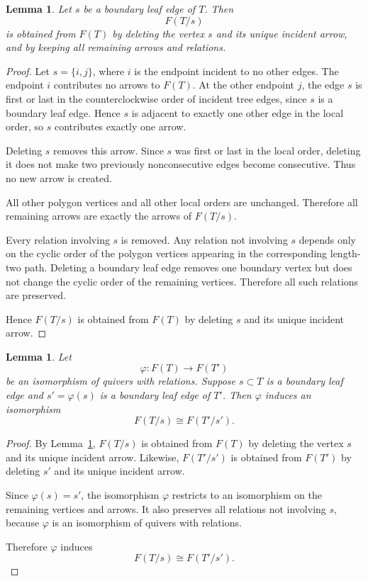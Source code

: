 \documentclass[12pt]{amsart}
\newtheorem{lem}[thm]{Lemma}
\theoremstyle{definition}
\theoremstyle{remark}
\numberwithin{equation}{section}
\begin{document}
\begin{lem}\label{lem:deletion-compatible}
Let \(s\) be a boundary leaf edge of \(T\). Then
\[
F(T/s)
\]
is obtained from \(F(T)\) by deleting the vertex \(s\) and its unique incident arrow, and by keeping all remaining arrows and relations.
\end{lem}

\begin{proof}
Let $s = \{i,j\}$, where $i$ is the endpoint incident to no other edges. The endpoint $i$ contributes no arrows to \(F(T)\). At the other endpoint $j$, the edge \(s\) is first or last in the counterclockwise order of incident tree edges, since \(s\) is a boundary leaf edge. Hence \(s\) is adjacent to exactly one other edge in the local order, so \(s\) contributes exactly one arrow.

Deleting \(s\) removes this arrow. Since \(s\) was first or last in the local order, deleting it does not make two previously nonconsecutive edges become consecutive. Thus no new arrow is created.

All other polygon vertices and all other local orders are unchanged. Therefore all remaining arrows are exactly the arrows of \(F(T/s)\).

Every relation involving \(s\) is removed. Any relation not involving \(s\) depends only on the cyclic order of the polygon vertices appearing in the corresponding length-two path. Deleting a boundary leaf edge removes one boundary vertex but does not change the cyclic order of the remaining vertices. Therefore all such relations are preserved.

Hence \(F(T/s)\) is obtained from \(F(T)\) by deleting \(s\) and its unique incident arrow.
\end{proof}


\begin{lem}\label{lem:induced-isomorphism-after-deletion}
Let
\[
\varphi:F(T)\to F(T')
\]
be an isomorphism of quivers with relations. Suppose \(s\subset T\) is a boundary leaf edge and \(s'=\varphi(s)\) is a boundary leaf edge of \(T'\). Then \(\varphi\) induces an isomorphism
\[
F(T/s)\cong F(T'/s').
\]
\end{lem}

\begin{proof}
By Lemma~\ref{lem:deletion-compatible}, \(F(T/s)\) is obtained from \(F(T)\) by deleting the vertex \(s\) and its unique incident arrow. Likewise, \(F(T'/s')\) is obtained from \(F(T')\) by deleting \(s'\) and its unique incident arrow.

Since \(\varphi(s)=s'\), the isomorphism \(\varphi\) restricts to an isomorphism on the remaining vertices and arrows. It also preserves all relations not involving \(s\), because \(\varphi\) is an isomorphism of quivers with relations.

Therefore \(\varphi\) induces
\[
F(T/s)\cong F(T'/s').
\]
\end{proof}
\end{document}
